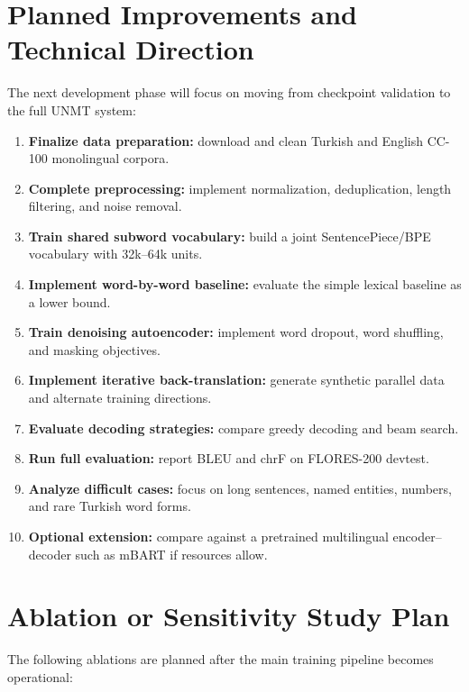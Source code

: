 \documentclass[11pt]{article}
\begin{document}
\section{Planned Improvements and Technical Direction}

The next development phase will focus on moving from checkpoint validation to the full UNMT system:

\begin{enumerate}
    \item \textbf{Finalize data preparation:} download and clean Turkish and English CC-100 monolingual corpora.
    \item \textbf{Complete preprocessing:} implement normalization, deduplication, length filtering, and noise removal.
    \item \textbf{Train shared subword vocabulary:} build a joint SentencePiece/BPE vocabulary with 32k--64k units.
    \item \textbf{Implement word-by-word baseline:} evaluate the simple lexical baseline as a lower bound.
    \item \textbf{Train denoising autoencoder:} implement word dropout, word shuffling, and masking objectives.
    \item \textbf{Implement iterative back-translation:} generate synthetic parallel data and alternate training directions.
    \item \textbf{Evaluate decoding strategies:} compare greedy decoding and beam search.
    \item \textbf{Run full evaluation:} report BLEU and chrF on FLORES-200 devtest.
    \item \textbf{Analyze difficult cases:} focus on long sentences, named entities, numbers, and rare Turkish word forms.
    \item \textbf{Optional extension:} compare against a pretrained multilingual encoder--decoder such as mBART if resources allow.
\end{enumerate}

\section{Ablation or Sensitivity Study Plan}

The following ablations are planned after the main training pipeline becomes operational:
\end{document}
